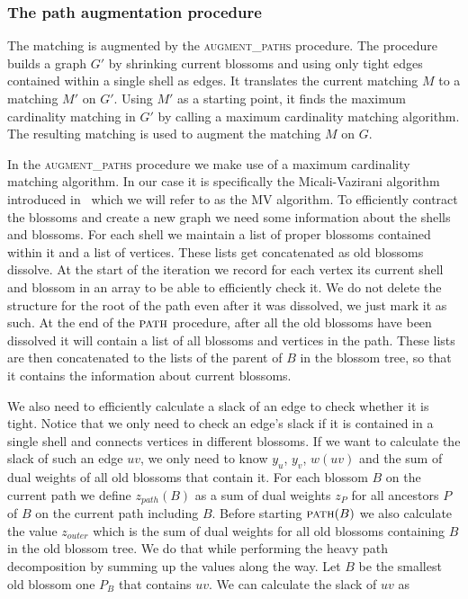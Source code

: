 \subsubsection{The path augmentation procedure}

The matching is augmented by the \textsc{augment\_paths} procedure. The procedure builds a graph $G'$ by shrinking current blossoms and using only tight edges contained within a single shell as edges. It translates the current matching $M$ to a matching $M'$ on $G'$. Using $M'$ as a starting point, it finds the maximum cardinality matching in $G'$ by calling a maximum cardinality matching algorithm. The resulting matching is used to augment the matching $M$ on $G$.

In the \textsc{augment\_paths} procedure we make use of a maximum cardinality matching algorithm. In our case it is specifically the Micali-Vazirani algorithm introduced in~\cite{micali1980v} which we will refer to as the MV algorithm. To efficiently contract the blossoms and create a new graph we need some information about the shells and blossoms. For each shell we maintain a list of proper blossoms contained within it and a list of vertices. These lists get concatenated as old blossoms dissolve. At the start of the iteration we record for each vertex its current shell and blossom in an array to be able to efficiently check it. We do not delete the structure for the root of the path even after it was dissolved, we just mark it as such. At the end of the $\textsc{path}$ procedure, after all the old blossoms have been dissolved it will contain a list of all blossoms and vertices in the path. These lists are then concatenated to the lists of the parent of $B$ in the blossom tree, so that it contains the information about current blossoms.

We also need to efficiently calculate a slack of an edge to check whether it is tight. Notice that we only need to check an edge's slack if it is contained in a single shell and connects vertices in different blossoms. If we want to calculate the slack of such an edge $uv$, we only need to know $y_u$, $y_v$, $w(uv)$ and the sum of dual weights of all old blossoms that contain it. For each blossom $B$ on the current path we define $z_{path}(B)$ as a sum of dual weights $z_P$ for all ancestors $P$ of $B$ on the current path including $B$. Before starting $\textsc{path}(B)$ we also calculate the value $z_{outer}$ which is the sum of dual weights for all old blossoms containing $B$ in the old blossom tree. We do that while performing the heavy path decomposition by summing up the values along the way. Let $B$ be the smallest old blossom one $P_B$ that contains $uv$. We can calculate the slack of $uv$ as

